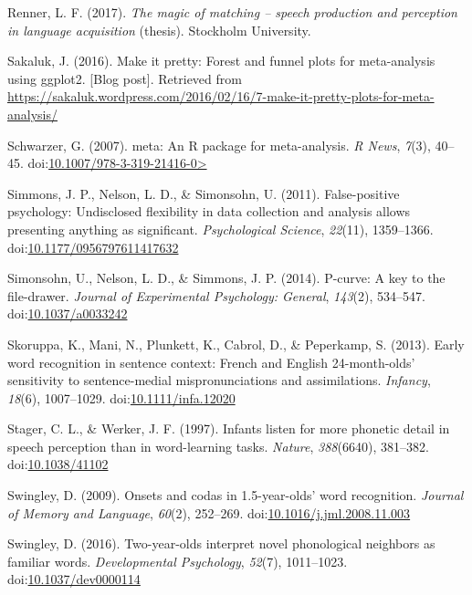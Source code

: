 \documentclass[man]{apa6}
\begin{document}
\leavevmode\hypertarget{ref-Renner2017}{}%
Renner, L. F. (2017). \emph{The magic of matching -- speech production and perception in language acquisition} (thesis). Stockholm University.

\leavevmode\hypertarget{ref-Sakaluk2016}{}%
Sakaluk, J. (2016). Make it pretty: Forest and funnel plots for meta-analysis using ggplot2. {[}Blog post{]}. Retrieved from \url{https://sakaluk.wordpress.com/2016/02/16/7-make-it-pretty-plots-for-meta-analysis/}

\leavevmode\hypertarget{ref-meta}{}%
Schwarzer, G. (2007). meta: An R package for meta-analysis. \emph{R News}, \emph{7}(3), 40--45. doi:\href{https://doi.org/10.1007/978-3-319-21416-0\%3E}{10.1007/978-3-319-21416-0\textgreater{}}

\leavevmode\hypertarget{ref-Simmons2011}{}%
Simmons, J. P., Nelson, L. D., \& Simonsohn, U. (2011). False-positive psychology: Undisclosed flexibility in data collection and analysis allows presenting anything as significant. \emph{Psychological Science}, \emph{22}(11), 1359--1366. doi:\href{https://doi.org/10.1177/0956797611417632}{10.1177/0956797611417632}

\leavevmode\hypertarget{ref-pcurve}{}%
Simonsohn, U., Nelson, L. D., \& Simmons, J. P. (2014). P-curve: A key to the file-drawer. \emph{Journal of Experimental Psychology: General}, \emph{143}(2), 534--547. doi:\href{https://doi.org/10.1037/a0033242}{10.1037/a0033242}

\leavevmode\hypertarget{ref-Skoruppa2013}{}%
Skoruppa, K., Mani, N., Plunkett, K., Cabrol, D., \& Peperkamp, S. (2013). Early word recognition in sentence context: French and English 24-month-olds' sensitivity to sentence-medial mispronunciations and assimilations. \emph{Infancy}, \emph{18}(6), 1007--1029. doi:\href{https://doi.org/10.1111/infa.12020}{10.1111/infa.12020}

\leavevmode\hypertarget{ref-Stager1997}{}%
Stager, C. L., \& Werker, J. F. (1997). Infants listen for more phonetic detail in speech perception than in word-learning tasks. \emph{Nature}, \emph{388}(6640), 381--382. doi:\href{https://doi.org/10.1038/41102}{10.1038/41102}

\leavevmode\hypertarget{ref-Swingley2009}{}%
Swingley, D. (2009). Onsets and codas in 1.5-year-olds' word recognition. \emph{Journal of Memory and Language}, \emph{60}(2), 252--269. doi:\href{https://doi.org/10.1016/j.jml.2008.11.003}{10.1016/j.jml.2008.11.003}

\leavevmode\hypertarget{ref-Swingley2016}{}%
Swingley, D. (2016). Two-year-olds interpret novel phonological neighbors as familiar words. \emph{Developmental Psychology}, \emph{52}(7), 1011--1023. doi:\href{https://doi.org/10.1037/dev0000114}{10.1037/dev0000114}
\end{document}
